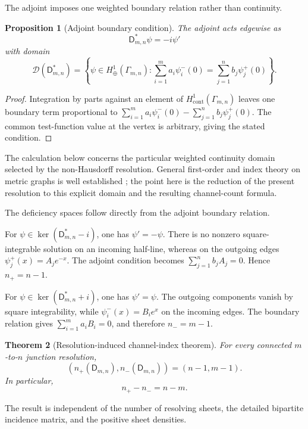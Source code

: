 \documentclass[11pt]{article}
\theoremstyle{plain}
\newtheorem{theorem}{Theorem}[section]
\newtheorem{proposition}[theorem]{Proposition}
\theoremstyle{definition}
\begin{document}
The adjoint imposes one weighted boundary relation rather than continuity.

\begin{proposition}[Adjoint boundary condition]
\label{prop:Bmn-adjoint}
The adjoint acts edgewise as
\[
  \mathsf D_{m,n}^*\psi=-i\psi'
\]
with domain
\[
  \mathcal D(\mathsf D_{m,n}^*)
  =
  \left\{
    \psi\in H^1_\oplus(\Gamma_{m,n}):
    \sum_{i=1}^{m}
    a_i\psi_i^-(0)
    =
    \sum_{j=1}^{n}
    b_j\psi_j^+(0)
  \right\}.
\]
\end{proposition}

\begin{proof}
Integration by parts against an element of
\(H^1_{\mathrm{cont}}(\Gamma_{m,n})\) leaves one boundary term proportional
to
\(\sum_{i=1}^{m} a_i\psi_i^-(0) - \sum_{j=1}^{n} b_j\psi_j^+(0)\).
The common test-function value at the vertex is arbitrary, giving the stated
condition.
\end{proof}

The calculation below concerns the particular weighted continuity domain
selected by the non-Hausdorff resolution. General first-order and index
theory on metric graphs is well established
\citep{FullingKuchmentWilson07,Post09,ExnerMomentum13,Richtsfeld24};
the point here is the reduction of the present resolution to this explicit
domain and the resulting channel-count formula.

The deficiency spaces follow directly from the adjoint boundary relation.

For
\(\psi\in\ker(\mathsf D_{m,n}^*-i)\),
one has
\(\psi'=-\psi\).
There is no nonzero square-integrable solution on an incoming half-line,
whereas on the outgoing edges
\(\psi_j^+(x)=A_je^{-x}\).
The adjoint condition becomes
\(\sum_{j=1}^{n}b_jA_j=0\).
Hence
\(n_+=n-1\).

For
\(\psi\in\ker(\mathsf D_{m,n}^*+i)\),
one has
\(\psi'=\psi\).
The outgoing components vanish by square integrability, while \(\psi_i^-(x)=B_ie^x\) on the incoming edges. The boundary relation gives
\(\sum_{i=1}^{m}a_iB_i=0\),
and therefore
\(n_-=m-1\).

\begin{theorem}[Resolution-induced channel-index theorem]
\label{thm:Bmn-deficiency}
For every connected \(m\)-to-\(n\) junction resolution,
\[
  \left(
    n_+(\mathsf D_{m,n}),
    n_-(\mathsf D_{m,n})
  \right)
  =
  (n-1,m-1).
\]
In particular,
\[
  n_+-n_-
  =
  n-m.
\]
\end{theorem}

The result is independent of the number of resolving sheets, the detailed
bipartite incidence matrix, and the positive sheet densities.
\end{document}
